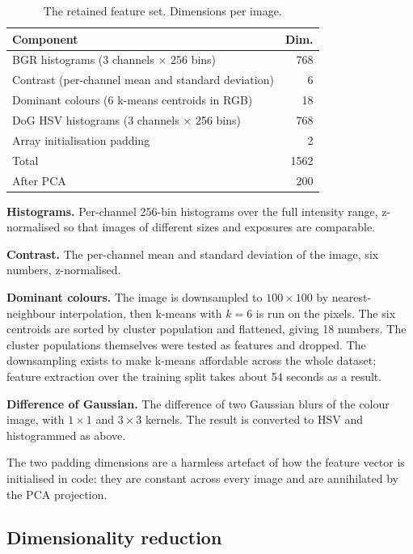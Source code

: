 \documentclass[10pt, conference, letterpaper]{IEEEtran}
\begin{document}
\begin{table}[t]
\centering
\caption{The retained feature set. Dimensions per image.}
\label{tab:features}
\begin{tabular}{lr}
\toprule
Component & Dim. \\
\midrule
BGR histograms (3 channels $\times$ 256 bins)         & 768 \\
Contrast (per-channel mean and standard deviation)    & 6 \\
Dominant colours (6 k-means centroids in RGB)         & 18 \\
DoG HSV histograms (3 channels $\times$ 256 bins)     & 768 \\
Array initialisation padding                          & 2 \\
\midrule
Total                                                 & 1562 \\
After PCA                                             & 200 \\
\bottomrule
\end{tabular}
\end{table}

\textbf{Histograms.} Per-channel 256-bin histograms over the full intensity range, z-normalised so that images of different sizes and exposures are comparable.

\textbf{Contrast.} The per-channel mean and standard deviation of the image, six numbers, z-normalised.

\textbf{Dominant colours.} The image is downsampled to $100 \times 100$ by nearest-neighbour interpolation, then k-means with $k=6$ is run on the pixels. The six centroids are sorted by cluster population and flattened, giving 18 numbers. The cluster populations themselves were tested as features and dropped. The downsampling exists to make k-means affordable across the whole dataset; feature extraction over the training split takes about 54 seconds as a result.

\textbf{Difference of Gaussian.} The difference of two Gaussian blurs of the colour image, with $1 \times 1$ and $3 \times 3$ kernels. The result is converted to HSV and histogrammed as above.

The two padding dimensions are a harmless artefact of how the feature vector is initialised in code: they are constant across every image and are annihilated by the PCA projection.

\subsection{Dimensionality reduction}
\end{document}
